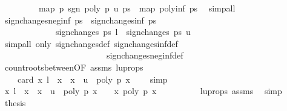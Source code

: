 \begin{isabellebody}
\ \ \ \ \ \ \ \ \ {\isachardoublequoteopen}map\ {\isacharparenleft}{\isasymlambda}p{\isachardot}\ sgn\ {\isacharparenleft}poly\ p\ u{\isacharparenright}{\isacharparenright}\ ps\ {\isacharequal}\ map\ poly{\isacharunderscore}inf\ ps{\isachardoublequoteclose}\ \isamarkupfalse%
\ simp{\isacharunderscore}all\isanewline
\ \ \isamarkupfalse%
\ {\isachardoublequoteopen}sign{\isacharunderscore}changes{\isacharunderscore}neg{\isacharunderscore}inf\ ps\ {\isacharminus}\ sign{\isacharunderscore}changes{\isacharunderscore}inf\ ps\ {\isacharequal}\isanewline
\ \ \ \ \ \ \ \ \ \ \ \ \ sign{\isacharunderscore}changes\ ps\ l\ {\isacharminus}\ sign{\isacharunderscore}changes\ ps\ u{\isachardoublequoteclose}\isanewline
\ \ \ \ \ \ \isamarkupfalse%
\ {\isacharparenleft}simp{\isacharunderscore}all\ only{\isacharcolon}\ sign{\isacharunderscore}changes{\isacharunderscore}def\ sign{\isacharunderscore}changes{\isacharunderscore}inf{\isacharunderscore}def\ \isanewline
\ \ \ \ \ \ \ \ \ \ \ \ \ \ \ \ \ \ \ \ \ \ \ \ \ sign{\isacharunderscore}changes{\isacharunderscore}neg{\isacharunderscore}inf{\isacharunderscore}def{\isacharparenright}\isanewline
\ \ \isamarkupfalse%
\ \isamarkupfalse%
\ count{\isacharunderscore}roots{\isacharunderscore}between{\isacharbrackleft}OF\ assms{\isacharbrackright}\ lu{\isacharunderscore}props\isanewline
\ \ \ \ \ \ \isamarkupfalse%
\ {\isachardoublequoteopen}{\isachardot}{\isachardot}{\isachardot}\ {\isacharequal}\ \ card\ {\isacharbraceleft}x{\isachardot}\ l\ {\isacharless}\ x\ {\isasymand}\ x\ {\isasymle}\ u\ {\isasymand}\ poly\ p\ x\ {\isacharequal}\ {}{\isacharbraceright}{\isachardoublequoteclose}\ \isamarkupfalse%
\ simp\isanewline
\ \ \isamarkupfalse%
\ \isamarkupfalse%
\ {\isachardoublequoteopen}{\isacharbraceleft}x{\isachardot}\ l\ {\isacharless}\ x\ {\isasymand}\ x\ {\isasymle}\ u\ {\isasymand}\ poly\ p\ x\ {\isacharequal}\ {}{\isacharbraceright}\ {\isacharequal}\ {\isacharbraceleft}x{\isachardot}\ poly\ p\ x\ {\isacharequal}\ {}{\isacharbraceright}{\isachardoublequoteclose}\isanewline
\ \ \ \ \ \ \isamarkupfalse%
\ lu{\isacharunderscore}props\ assms\ \isamarkupfalse%
\ simp\isanewline
\ \ \isamarkupfalse%
\ \isamarkupfalse%
\ {\isacharquery}thesis\ \isacommand{{\isachardot}}\isamarkupfalse%
\isanewline
{}\isamarkupfalse%
%
\endisatagproof
{\isafoldproof}%
%
\isadelimproof
%
\endisadelimproof

\end{isabellebody}

